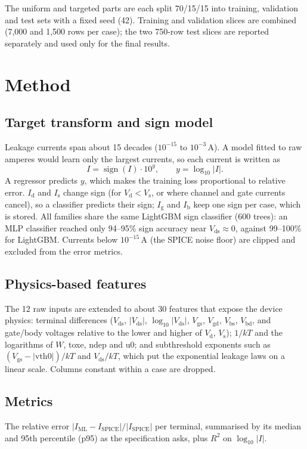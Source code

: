 \documentclass[11pt,a4paper]{article}
\newcommand{\Id}{I_\mathrm{d}}
\newcommand{\Ig}{I_\mathrm{g}}
\newcommand{\Is}{I_\mathrm{s}}
\newcommand{\Ib}{I_\mathrm{b}}
\newcommand{\Vds}{V_\mathrm{ds}}
\begin{document}
The uniform and targeted parts are each split 70/15/15 into training, validation and test sets with
a fixed seed (42). Training and validation slices are combined (7,000 and 1,500 rows per case); the
two 750-row test slices are reported separately and used only for the final results.

\section{Method}
\subsection{Target transform and sign model}
Leakage currents span about 15 decades ($10^{-15}$ to $10^{-3}$\,A). A model fitted to raw amperes
would learn only the largest currents, so each current is written as
\begin{equation}
  I = \operatorname{sign}(I)\cdot 10^{y}, \qquad y = \log_{10}|I| .
\end{equation}
A regressor predicts $y$, which makes the training loss proportional to relative error. $\Id$ and
$\Is$ change sign (for $V_\mathrm{d} < V_\mathrm{s}$, or where channel and gate currents cancel), so a
classifier predicts their sign; $\Ig$ and $\Ib$ keep one sign per case, which is stored. All families
share the same LightGBM sign classifier (600 trees): an MLP classifier reached only 94--95\% sign
accuracy near $\Vds \approx 0$, against 99--100\% for LightGBM. Currents below $10^{-15}$\,A (the
SPICE noise floor) are clipped and excluded from the error metrics.

\subsection{Physics-based features}
The 12 raw inputs are extended to about 30 features that expose the device physics: terminal
differences ($\Vds$, $|\Vds|$, $\log_{10}|\Vds|$, $V_\mathrm{gs}$, $V_\mathrm{gd}$, $V_\mathrm{bs}$,
$V_\mathrm{bd}$, and gate/body voltages relative to the lower and higher of $V_\mathrm{d}$,
$V_\mathrm{s}$); $1/kT$ and the logarithms of $W$, toxe, ndep and u0; and subthreshold exponents
such as $(V_\mathrm{gs} - |\mathrm{vth0}|)/kT$ and $\Vds/kT$, which put the exponential leakage
laws on a linear scale. Columns constant within a case are dropped.

\subsection{Metrics}
The relative error $|I_\mathrm{ML} - I_\mathrm{SPICE}| / |I_\mathrm{SPICE}|$ per terminal, summarised
by its median and 95th percentile (p95) as the specification asks, plus $R^2$ on $\log_{10}|I|$.
\end{document}
